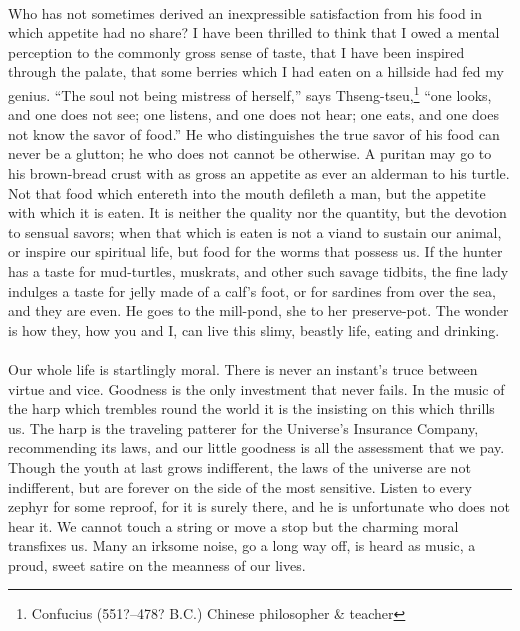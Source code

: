 \documentclass[letterpaper,12pt]{article}
\begin{document}
\paragraph{} Who has not sometimes derived an inexpressible satisfaction from
his food in which appetite had no share? I have been thrilled to think that I
owed a mental perception to the commonly gross sense of taste, that I have been
inspired through the palate, that some berries which I had eaten on a hillside
had fed my genius. \enquote{The soul not being mistress of herself,} says
Thseng-tseu,\footnote{Confucius (551?--478? B.C.) Chinese philosopher \&
    teacher} \enquote{one looks, and one does not see; one listens, and one does
    not hear; one eats, and one does not know the savor of food.} He who
distinguishes the true savor of his food can never be a glutton; he who does not
cannot be otherwise. A puritan may go to his brown-bread crust with as gross an
appetite as ever an alderman to his turtle. Not that food which entereth into
the mouth defileth a man, but the appetite with which it is eaten. It is neither
the quality nor the quantity, but the devotion to sensual savors; when that
which is eaten is not a viand to sustain our animal, or inspire our spiritual
life, but food for the worms that possess us. If the hunter has a taste for
mud-turtles, muskrats, and other such savage tidbits, the fine lady indulges a
taste for jelly made of a calf's foot, or for sardines from over the sea, and
they are even. He goes to the mill-pond, she to her preserve-pot. The wonder is
how they, how you and I, can live this slimy, beastly life, eating and drinking.

\paragraph{} Our whole life is startlingly moral. There is never an instant's
truce between virtue and vice. Goodness is the only investment that never fails.
In the music of the harp which trembles round the world it is the insisting on
this which thrills us. The harp is the traveling patterer for the Universe's
Insurance Company, recommending its laws, and our little goodness is all the
assessment that we pay. Though the youth at last grows indifferent, the laws of
the universe are not indifferent, but are forever on the side of the most
sensitive. Listen to every zephyr for some reproof, for it is surely there, and
he is unfortunate who does not hear it. We cannot touch a string or move a stop
but the charming moral transfixes us. Many an irksome noise, go a long way off,
is heard as music, a proud, sweet satire on the meanness of our lives.
\end{document}
